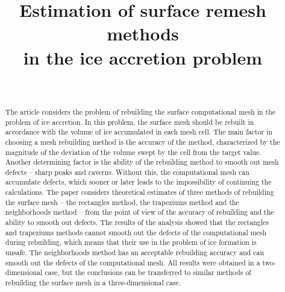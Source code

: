 \documentclass[
11pt,%
tightenlines,%
twoside,%
onecolumn,%
nofloats,%
nobibnotes,%
nofootinbib,%
superscriptaddress,%
noshowpacs,%
centertags]%
{revtex4}
\begin{document}

\title{Estimation of surface remesh methods \\ in the ice accretion problem}

\author{~}




\begin{abstract} %
The article considers the problem of rebuilding the surface computational mesh in the problem of ice accretion.
In this problem, the surface mesh should be rebuilt in accordance with the volume of ice accumulated in each mesh cell.
The main factor in choosing a mesh rebuilding method is the accuracy of the method, characterized by the magnitude of the deviation of the volume swept by the cell from the target value.
Another determining factor is the ability of the rebuilding method to smooth out mesh defects -- sharp peaks and caverns.
Without this, the computational mesh can accumulate defects, which sooner or later leads to the impossibility of continuing the calculations.
The paper considers theoretical estimates of three methods of rebuilding the surface mesh -- the rectangles method, the trapeziums method and the neighborhoods method -- from the point of view of the accuracy of rebuilding and the ability to smooth out defects.
The results of the analysis showed that the rectangles and trapeziums methods cannot smooth out the defects of the computational mesh during rebuilding, which means that their use in the problem of ice formation is unsafe.
The neighborhoods method has an acceptable rebuilding accuracy and can smooth out the defects of the computational mesh. All results were obtained in a two-dimensional case, but the conclusions can be transferred to similar methods of rebuilding the surface mesh in a three-dimensional case.\end{abstract}
\end{document}
